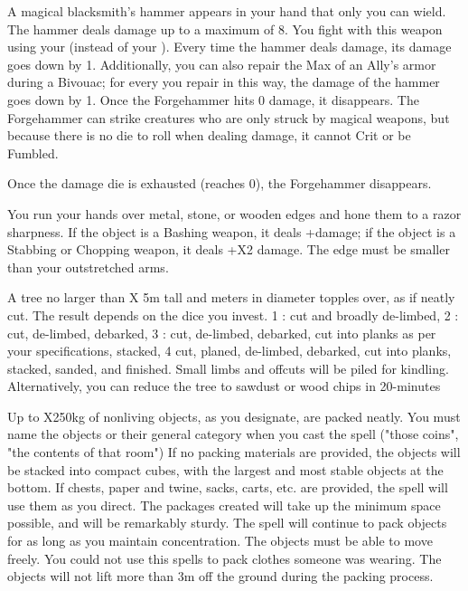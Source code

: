{\MYSTERY [
  Name = Forgehammer,
  Link = arcana-mystery-forgehammer,
  Paradigm = Force,
  Save = N,
  Duration = Session,
  Target = Self
]

A magical blacksmith's hammer appears in your hand that only you can wield.  The hammer deals \DICE damage up to a maximum of 8. You fight with this weapon using your \FOC (instead of your \VIG).  Every time the hammer deals damage, its damage goes down by 1.   Additionally, you can also repair the Max \UD of an Ally's armor during a Bivouac; for every \DCUP you repair in this way, the damage of the hammer goes down by 1.  Once the Forgehammer hits 0 damage, it disappears. The Forgehammer can strike creatures who are only struck by magical weapons, but because there is no die to roll when dealing damage, it cannot Crit or be Fumbled.

Once the damage die is exhausted (reaches 0), the Forgehammer disappears.


\MYSTERY [
  Name = Hone,
  Link = arcana-mystery-hone,
  Paradigm = Force,
  Save = N,
  Duration = Combat or \SUM Minutes,
  Target = Close Target(s)
]

You run your hands over \DICE metal, stone, or wooden edges and hone them to a razor sharpness. If the object is a Bashing weapon, it deals +\DICE damage; if the object is a Stabbing or Chopping weapon, it deals +\DICE X2 damage. The edge must be smaller than your outstretched arms.

\MYSTERY [
  Name = Millworks,
  Link = arcana-mystery-millworks,
  Paradigm = Entropy,
  Save = N,
  Duration = Instant,
  Target = Close Target(s)
]

A tree no larger than \DICE X 5m tall and \DICE meters in diameter topples over, as if neatly cut. The result depends on the dice you invest. 1 \DICE: cut and broadly de-limbed, 2 \DICE: cut, de-limbed, debarked, 3 \DICE: cut, de-limbed, debarked, cut into planks as per your specifications, stacked, 4 \DICE cut, planed, de-limbed, debarked, cut into planks, stacked, sanded, and finished. Small limbs and offcuts will be piled for kindling. Alternatively, you can reduce the tree to sawdust or wood chips in 20-\SUMDICE minutes


\MYSTERY [
  Name = Package Neatly,
  Link = arcana-mystery-package-neatly,
  Paradigm = Entropy,
  Save = n/a,
  Duration = Concentration or Permanent,
  Target = Nearby Target(s)
]

Up to \DICE X250kg of nonliving objects, as you designate, are packed neatly. You must name the objects or their general category when you cast the spell ("those coins", "the contents of that room") If no packing materials are provided, the objects will be stacked into compact cubes, with the largest and most stable objects at the bottom. If chests, paper and twine, sacks, carts, etc. are provided, the spell will use them as you direct. The packages created will take up the minimum space possible, and will be remarkably sturdy. The spell will continue to pack objects for as long as you maintain concentration. The objects must be able to move freely. You could not use this spells to pack clothes someone was wearing. The objects will not lift more than 3m off the ground during the packing process.

}
